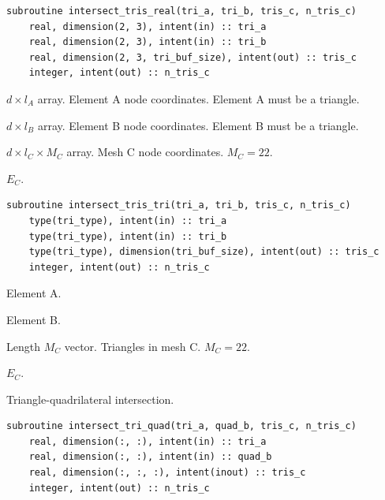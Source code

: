 \documentclass{article}
\begin{document}
\begin{lstlisting}[language=FORTRAN]
  subroutine intersect_tris_real(tri_a, tri_b, tris_c, n_tris_c)
    real, dimension(2, 3), intent(in) :: tri_a
    real, dimension(2, 3), intent(in) :: tri_b
    real, dimension(2, 3, tri_buf_size), intent(out) :: tris_c
    integer, intent(out) :: n_tris_c
\end{lstlisting}

\begin{description}[font=\ttfamily\bfseries,leftmargin=2.2\parindent,labelindent=1.7\parindent,noitemsep]
  \item[tri\_a] $d \times l_A$ array. Element A node coordinates. Element A
    must be a triangle.
  \item[tri\_b] $d \times l_B$ array. Element B node coordinates. Element B
    must be a triangle.
  \item[tris\_c] $d \times l_C \times M_C$ array. Mesh C node coordinates.
    $M_C = 22$.
  \item[n\_tris\_c] $E_C$.
\end{description}

\begin{lstlisting}[language=FORTRAN]
  subroutine intersect_tris_tri(tri_a, tri_b, tris_c, n_tris_c)
    type(tri_type), intent(in) :: tri_a
    type(tri_type), intent(in) :: tri_b
    type(tri_type), dimension(tri_buf_size), intent(out) :: tris_c
    integer, intent(out) :: n_tris_c
\end{lstlisting}

\begin{description}[font=\ttfamily\bfseries,leftmargin=2.2\parindent,labelindent=1.7\parindent,noitemsep]
  \item[tri\_a] Element A.
  \item[tri\_b] Element B.
  \item[tris\_c] Length $M_C$ vector. Triangles in mesh C. $M_C = 22$.
  \item[n\_tris\_c] $E_C$.
\end{description}

\noindent Triangle-quadrilateral intersection.

\begin{lstlisting}[language=FORTRAN]
  subroutine intersect_tri_quad(tri_a, quad_b, tris_c, n_tris_c)
    real, dimension(:, :), intent(in) :: tri_a
    real, dimension(:, :), intent(in) :: quad_b
    real, dimension(:, :, :), intent(inout) :: tris_c
    integer, intent(out) :: n_tris_c
\end{lstlisting}
\end{document}
